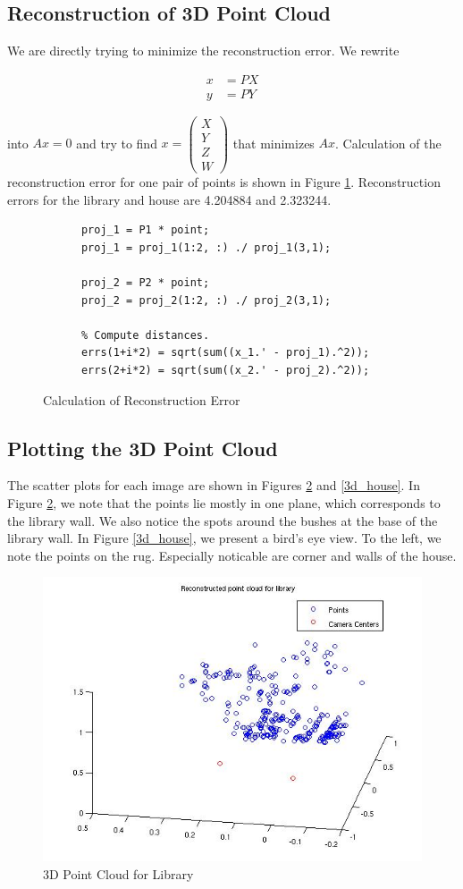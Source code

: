 \documentclass[11pt]{article}
\begin{document}
\subsection{Reconstruction of 3D Point Cloud}
We are directly trying to minimize the reconstruction error. We rewrite

\begin{align*}
  x &= PX\\
  y &= PY
\end{align*}

into $Ax = 0$ and try to find $x = \begin{pmatrix}X\\Y\\Z\\W\end{pmatrix}$
that minimizes $Ax$. Calculation of the reconstruction error for one pair of
points is shown in Figure \ref{reconstruction_code}. Reconstruction errors for
the library and house are 4.204884 and 2.323244.

\begin{figure}[h!]
  \caption{Calculation of Reconstruction Error}
  \label{reconstruction_code}
  \centering
    \begin{lstlisting}
      proj_1 = P1 * point;
      proj_1 = proj_1(1:2, :) ./ proj_1(3,1);

      proj_2 = P2 * point;
      proj_2 = proj_2(1:2, :) ./ proj_2(3,1);

      % Compute distances.
      errs(1+i*2) = sqrt(sum((x_1.' - proj_1).^2));
      errs(2+i*2) = sqrt(sum((x_2.' - proj_2).^2));
    \end{lstlisting}
\end{figure}


\subsection{Plotting the 3D Point Cloud}
The scatter plots for each image are shown in Figures \ref{3d_lib} and
\ref{3d_house}. In Figure \ref{3d_lib}, we note that the points lie mostly
in one plane, which corresponds to the library wall. We also notice the spots
around the bushes at the base of the library wall. In Figure \ref{3d_house},
we present a bird's eye view. To the left, we note the points on the rug.
Especially noticable are corner and walls of the house.

\begin{figure}[h!]
  \caption{3D Point Cloud for Library}
  \label{3d_lib}
  \centering
    \includegraphics[width=0.6\linewidth]{../img/library_camera.jpg}
\end{figure}
\end{document}
